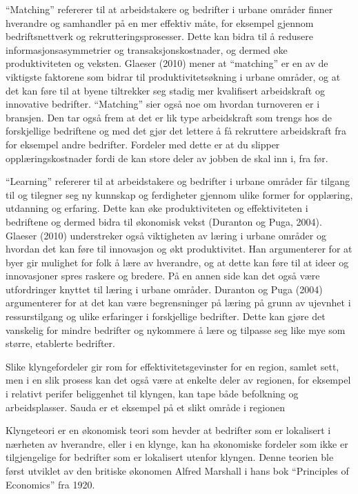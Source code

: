 \documentclass[
]{article}
\begin{document}
``Matching'' refererer til at arbeidstakere og bedrifter i urbane
områder finner hverandre og samhandler på en mer effektiv måte, for
eksempel gjennom bedriftsnettverk og rekrutteringsprosesser. Dette kan
bidra til å redusere informasjonsasymmetrier og transaksjonskostnader,
og dermed øke produktiviteten og veksten. Glaeser (2010) mener at
``matching'' er en av de viktigste faktorene som bidrar til
produktivitetsøkning i urbane områder, og at det kan føre til at byene
tiltrekker seg stadig mer kvalifisert arbeidskraft og innovative
bedrifter. ``Matching'' sier også noe om hvordan turnoveren er i
bransjen. Den tar også frem at det er lik type arbeidskraft som trengs
hos de forskjellige bedriftene og med det gjør det lettere å få
rekruttere arbeidskraft fra for eksempel andre bedrifter. Fordeler med
dette er at du slipper opplæringskostnader fordi de kan store deler av
jobben de skal inn i, fra før.

``Learning'' refererer til at arbeidstakere og bedrifter i urbane
områder får tilgang til og tilegner seg ny kunnskap og ferdigheter
gjennom ulike former for opplæring, utdanning og erfaring. Dette kan øke
produktiviteten og effektiviteten i bedriftene og dermed bidra til
økonomisk vekst (Duranton og Puga, 2004). Glaeser (2010) understreker
også viktigheten av læring i urbane områder og hvordan det kan føre til
innovasjon og økt produktivitet. Han argumenterer for at byer gir
mulighet for folk å lære av hverandre, og at dette kan føre til at ideer
og innovasjoner spres raskere og bredere. På en annen side kan det også
være utfordringer knyttet til læring i urbane områder. Duranton og Puga
(2004) argumenterer for at det kan være begrensninger på læring på grunn
av ujevnhet i ressurstilgang og ulike erfaringer i forskjellige
bedrifter. Dette kan gjøre det vanskelig for mindre bedrifter og
nykommere å lære og tilpasse seg like mye som større, etablerte
bedrifter.

Slike klyngefordeler gir rom for effektivitetsgevinster for en region,
samlet sett, men i en slik prosess kan det også være at enkelte deler av
regionen, for eksempel i relativt perifer beliggenhet til klyngen, kan
tape både befolkning og arbeidsplasser. Sauda er et eksempel på et slikt
område i regionen

Klyngeteori er en økonomisk teori som hevder at bedrifter som er
lokalisert i nærheten av hverandre, eller i en klynge, kan ha økonomiske
fordeler som ikke er tilgjengelige for bedrifter som er lokalisert
utenfor klyngen. Denne teorien ble først utviklet av den britiske
økonomen Alfred Marshall i hans bok ``Principles of Economics'' fra
1920.
\end{document}
